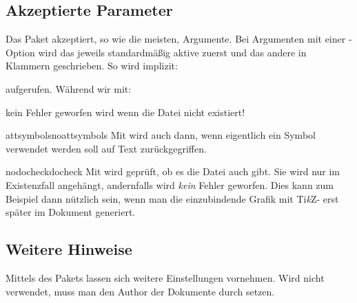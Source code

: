 \documentclass{sopra-base}
\begin{document}
\subsection{Akzeptierte Parameter}
    Das Paket akzeptiert, so wie die meisten, Argumente. 
    Bei Argumenten mit einer -Option wird das jeweils standardmäßig aktive zuerst und das andere in Klammern
    geschrieben. So wird implizit:
\begin{plainlatex}
    \usepackage[attsymbols,nodocheck]{sopra-attachments}
\end{plainlatex}
    aufgerufen. Während wir mit:
\begin{plainlatex}
    \usepackage[docheck]{sopra-attachments}
\end{plainlatex}
    kein Fehler geworfen wird wenn die Datei nicht existiert!

    \begin{argument}{attsymbols}{noattsymbols}
        Mit  wird auch dann, wenn eigentlich ein Symbol verwendet werden
        soll auf Text zurückgegriffen.
    \end{argument}

    \begin{argument}{nodocheck}{docheck}
        Mit  wird geprüft, ob es die Datei auch gibt. Sie wird nur im Existenzfall
        angehängt, andernfalls wird \emph{kein} Fehler geworfen. Dies kann zum Beispiel dann
        nützlich sein, wenn man die einzubindende Grafik mit Ti\textit{k}Z- erst
        später im Dokument generiert.
    \end{argument}

\subsection{Weitere Hinweise}

    Mittels  des Pakets  lassen sich weitere
    Einstellungen vornehmen. Wird nicht  verwendet, muss man den Author
    der Dokumente durch  setzen.

%
%
%
%
\end{document}
